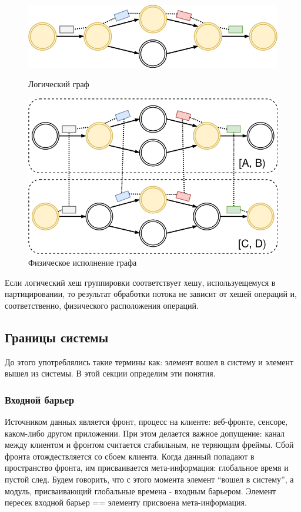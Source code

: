\documentclass[14pt]{matmex-diploma-custom}
\begin{document}
\begin{figure}[t]
  \centering
	\includegraphics[width=1.0\textwidth]{pics/logical.png}
	\caption{Логический граф}

  \centering
	\includegraphics[width=1.0\textwidth]{pics/physical.png}
	\caption{Физическое исполнение графа}
\end{figure}


Если логический хеш группировки соответствует хешу, используещемуся в партицировании, то результат обработки потока не зависит от хешей операций и, соответственно, физического расположения операций.

\subsection{Границы системы}

До этого употреблялись такие термины как: элемент вошел в систему и элемент вышел из системы. В этой секции определим эти понятия.

\subsubsection{Входной барьер}

Источником данных является фронт, процесс на клиенте: веб-фронте, сенсоре, каком-либо другом приложении. При этом делается важное допущение: канал между клиентом и фронтом считается стабильным, не теряющим фреймы. Сбой фронта отождествляется со сбоем клиента. Когда данный попадают в пространство фронта, им присваивается мета-информация: глобальное время и пустой след. Будем говорить, что с этого момента элемент “вошел в систему”, а модуль, присваивающий глобальные времена - входным барьером. Элемент пересек входной барьер == элементу присвоена мета-информация.
\end{document}
